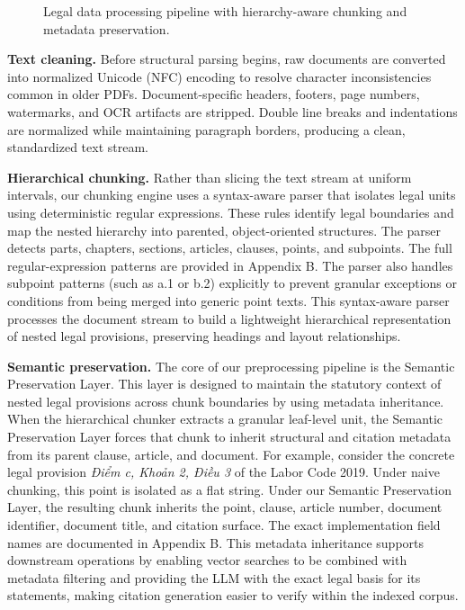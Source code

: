 \begin{figure}[htbp]
  \centering
  \resizebox{0.95\textwidth}{!}{}
  \caption{Legal data processing pipeline with hierarchy-aware chunking and metadata preservation.}
  \label{fig:data-processing-pipeline}
\end{figure}
\FloatBarrier

\textbf{Text cleaning.} Before structural parsing begins, raw documents are converted into normalized Unicode (NFC) encoding to resolve character inconsistencies common in older PDFs. Document-specific headers, footers, page numbers, watermarks, and OCR artifacts are stripped. Double line breaks and indentations are normalized while maintaining paragraph borders, producing a clean, standardized text stream.

\textbf{Hierarchical chunking.} Rather than slicing the text stream at uniform intervals, our chunking engine uses a syntax-aware parser that isolates legal units using deterministic regular expressions. These rules identify legal boundaries and map the nested hierarchy into parented, object-oriented structures. The parser detects parts, chapters, sections, articles, clauses, points, and subpoints. The full regular-expression patterns are provided in Appendix B. The parser also handles subpoint patterns (such as a.1 or b.2) explicitly to prevent granular exceptions or conditions from being merged into generic point texts. This syntax-aware parser processes the document stream to build a lightweight hierarchical representation of nested legal provisions, preserving headings and layout relationships.

\textbf{Semantic preservation.} The core of our preprocessing pipeline is the Semantic Preservation Layer. This layer is designed to maintain the statutory context of nested legal provisions across chunk boundaries by using metadata inheritance. When the hierarchical chunker extracts a granular leaf-level unit, the Semantic Preservation Layer forces that chunk to inherit structural and citation metadata from its parent clause, article, and document. For example, consider the concrete legal provision \textit{Điểm c, Khoản 2, Điều 3} of the Labor Code 2019. Under naive chunking, this point is isolated as a flat string. Under our Semantic Preservation Layer, the resulting chunk inherits the point, clause, article number, document identifier, document title, and citation surface. The exact implementation field names are documented in Appendix B. This metadata inheritance supports downstream operations by enabling vector searches to be combined with metadata filtering and providing the LLM with the exact legal basis for its statements, making citation generation easier to verify within the indexed corpus.

